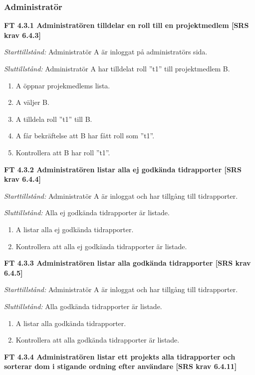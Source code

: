 \documentclass[a4paper]{article}
\begin{document}
\subsubsection{Administratör}

\textbf{FT 4.3.1 Administratören tilldelar en roll till en projektmedlem [SRS krav 6.4.3]}

\emph{Starttillstånd:} Administratör A är inloggat på administratörs sida.

\emph{Sluttillstånd:} Administratör A har tilldelat roll ”t1” till projektmedlem B.

\begin{enumerate}
\item A öppnar projekmedlems lista.
\item A väljer B.
\item A tilldela roll ”t1” till B.
\item A får bekräftelse att B har fått roll som ”t1”.
\item Kontrollera att B har roll ”t1”.
\end{enumerate}

\textbf{FT 4.3.2 Administratören listar alla ej godkända tidrapporter [SRS krav 6.4.4]}

\emph{Starttillstånd:} Administratör A är inloggat och har tillgång till tidrapporter.

\emph{Sluttillstånd:} Alla ej godkända tidrapporter är listade.

\begin{enumerate}
\item A listar alla ej godkända tidrapporter.
\item Kontrollera att alla ej godkända tidrapporter är listade.
\end{enumerate}

\textbf{FT 4.3.3 Administratören listar alla godkända tidrapporter [SRS krav 6.4.5]}

\emph{Starttillstånd:}  Administratör A är inloggat och har tillgång till tidrapporter.

\emph{Sluttillstånd:} Alla godkända tidrapporter är listade.

\begin{enumerate}
\item A listar alla godkända tidrapporter.
\item Kontrollera att alla godkända tidrapporter är listade.
\end{enumerate}

\textbf{FT 4.3.4 Administratören listar ett projekts alla tidrapporter och sorterar dom i stigande ordning efter användare [SRS krav 6.4.11]}
\end{document}

